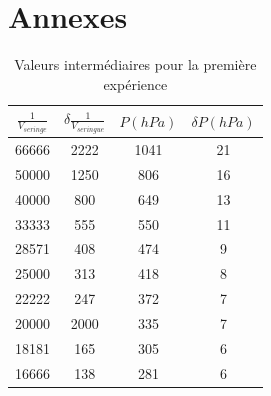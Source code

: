 \documentclass[12pt]{article}
\begin{document}
\section*{Annexes}
\begin{table}[h!]
\begin{center}
\begin{tabular}{|c|c|c|c|}
\hline
         $\frac{1}{V_{seringe}}$ &    $\delta \frac{1}{V_{seringue}}$ &  $P(hPa)$ &  $\delta P(hPa)$ \\
\hline
66666 & 2222 &                    1041 &           21 \\
50000 & 1250 &                     806 &           16 \\
40000 &  800 &                     649 &           13 \\
33333 &  555 &                     550 &           11 \\
28571 &  408 &                     474 &            9 \\
25000 &  313 &                     418 &            8 \\
22222 &  247 &                     372 &            7 \\
20000 &  2000 &                     335 &            7 \\
18181 &  165 &                     305 &            6 \\
16666 &  138 &                     281 &            6 \\
\hline
\end{tabular}
\end{center}
\label{Table1annexes}
\caption{Valeurs intermédiaires pour la première expérience}
\end{table}
\end{document}
